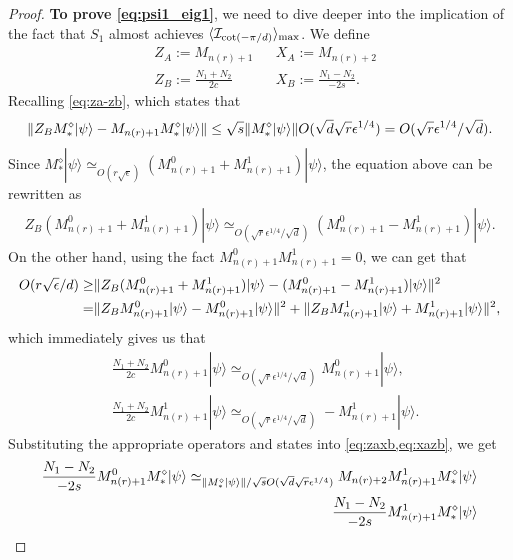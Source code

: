 \documentclass[11pt,letterpaper]{article}
\newcommand{\ket}[1]{|#1\rangle}
\DeclarePairedDelimiter{\norm}{\lVert}{\rVert}
\DeclarePairedDelimiter{\ip}{\langle}{\rangle}
\newcommand{\1}{\mathbb{1}}
\newcommand{\nr}{n(r)}
\newcommand{\I}{\mathcal{I}}
\newcommand{\se}{\sqrt{\epsilon}}
\newcommand{\qe}{\epsilon^{1/4}}
\newcommand{\sd}{\sqrt{d}}
\newcommand{\sr}{\sqrt{r}}
\newcommand{\appd}[1]{\simeq_{#1}}
\theoremstyle{definition}
\begin{document}
\begin{proof}
	\textbf{To prove \cref{eq:psi1_eig1}},
	we need to dive deeper into the implication of the fact that $S_1$ almost achieves $\ip{\I_{\cot(-\pi/d)}}_{\max}$.
	We define
	\begin{align}
		&Z_A  := M_{\nr+1} && X_A := M_{\nr+2} \\
		&Z_B := \frac{N_1+N_2}{2c} && X_B := \frac{N_1-N_2}{-2s}.
	\end{align}
	Recalling \cref{eq:za-zb}, which states that
	\begin{align*}
		\norm{Z_B M_\ast^\diamond \ket{\psi} - M_{\nr+1}M_\ast^\diamond \ket{\psi}} \leq 
		\sqrt{s}\norm{M_\ast^\diamond \ket{\psi}} O(\sd \sr \qe)
		= O(\sr \qe/ \sd ).
	\end{align*}
	Since $M_\ast^\diamond \ket{\psi} \appd{O(r\se)} (M_{\nr+1}^0 + M_{\nr+1}^1) \ket{\psi}$,
	the equation above can be rewritten as 
	\begin{align*}
		Z_B (M_{\nr+1}^0 + M_{\nr+1}^1) \ket{\psi} \appd{O(\sr \qe / \sd )} (M_{\nr+1}^0 - M_{\nr+1}^1) \ket{\psi}.
	\end{align*}
	On the other hand, using the fact $M_{\nr+1}^0 M_{\nr+1}^1 = 0$, we can get that
	\begin{align*}
		O(r\se/d) \geq &\norm{Z_B (M_{\nr+1}^0 + M_{\nr+1}^1) \ket{\psi} - (M_{\nr+1}^0 - M_{\nr+1}^1) \ket{\psi}}^2\\
		=&\norm{ Z_BM_{\nr+1}^0 \ket{\psi} - M_{\nr+1}^0\ket{\psi}}^2 + \norm{ Z_BM_{\nr+1}^1 \ket{\psi} + M_{\nr+1}^1\ket{\psi}}^2,
	\end{align*}
	which immediately gives us that 
	\begin{align}
		&\frac{N_1+N_2}{2c} M_{\nr+1}^0\ket{\psi} \appd{O( \sr \qe /\sd)} M_{\nr+1}^0 \ket{\psi},\\
		&\frac{N_1+N_2}{2c} M_{\nr+1}^1\ket{\psi} \appd{O( \sr \qe /\sd)} -M_{\nr+1}^1 \ket{\psi}.
	\end{align}
		Substituting the appropriate operators and states into \cref{eq:zaxb,eq:xazb}, we get
	\begin{align*}
		\frac{N_1-N_2}{-2s} M_{\nr+1}^0M_\ast^\diamond \ket{\psi} 
		\appd{\norm{M_\ast^\diamond\ket{\psi}}/\sqrt{s} O(\sd \sr \qe)}M_{\nr+2} M_{\nr+1}^1M_\ast^\diamond\ket{\psi}\\
		\frac{N_1 -N_2}{-2s} M_{\nr+1}^1M_\ast^\diamond \ket{\psi}  

\end{align*}
\end{proof}
\end{document}
